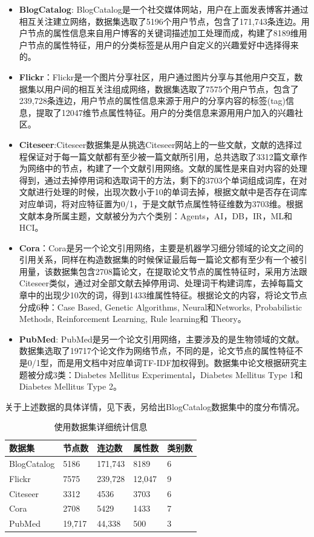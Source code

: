\begin{itemize}
	\item \textbf{BlogCatalog}: BlogCatalog是一个社交媒体网站，用户在上面发表博客并通过相互关注建立网络，数据集选取了5196个用户节点，包含了171,743条连边。用户节点的属性信息来自用户博客的关键词描述加工处理而成，构建了8189维用户节点的属性特征，用户的分类标签是从用户自定义的兴趣爱好中选择得来的。
	
	\item \textbf{Flickr}：Flickr是一个图片分享社区，用户通过图片分享与其他用户交互，数据集以用户间的相互关注组成网络，数据集选取了7575个用户节点，包含了239,728条连边，用户节点的属性信息来源于用户的分享内容的标签(tag)信息，提取了12047维节点属性特征。用户的分类信息来源用用户加入的兴趣社区。
	
	\item \textbf{Citeseer}:Citeseer数据集是从挑选Citeseer网站上的一些文献，文献的选择过程保证对于每一篇文献都有至少被一篇文献所引用，总共选取了3312篇文章作为网络中的节点，构建了一个文献引用网络。文献的属性是来自对内容的处理得到，通过去掉停用词和选取词干的方法，剩下的3703个单词组成词库，在对文献进行处理的时候，出现次数小于10的单词去掉，根据文献中是否存在词库对应单词，将对应特征置为0/1，于是文献节点属性特征维数为3703维。根据文献本身所属主题，文献被分为六个类别：Agents，AI，DB，IR，ML和HCI。
	
	\item \textbf{Cora}：Cora是另一个论文引用网络，主要是机器学习细分领域的论文之间的引用关系，同样在构造数据集的时候保证最后每一篇论文都有至少有一个被引用量，该数据集包含2708篇论文，在提取论文节点的属性特征时，采用方法跟Citeseer类似，通过对全部文献去掉停用词、处理词干构建词库，去掉每篇文章中的出现少10次的词，得到1433维属性特征。根据论文的内容，将论文节点分成6种：Case Based, Genetic Algorithms, Neural和Networks, Probabilistic Methods, Reinforcement Learning, Rule learning和 Theory。
	
	\item \textbf{PubMed}: PubMed是另一个论文引用网络，主要涉及的是生物领域的文献。数据集选取了19717个论文作为网络节点，不同的是，论文节点的属性特征不是0/1型，而是用文档中对应单词TF-IDF加权得到。数据集中论文根据研究主题被分成3类：Diabetes Mellitus Experimental，Diabetes Mellitus Type 1和Diabetes Mellitus Type 2。
	
\end{itemize}
关于上述数据的具体详情，见下表，另给出BlogCatalog数据集中的度分布情况。
\begin{table}
\centering
\caption{使用数据集详细统计信息}
\begin{tabular}{C{1in}C{1in}C{1in}C{1in}C{1in}}
\textbf{数据集} & \textbf{节点数} &\textbf{连边数} & \textbf{属性数}&\textbf{类别数}\\ \hline 
BlogCatalog & 5186  & 171,743 &8189&6\\
Flickr	& 7575 &239,728 & 12,047 & 9 \\
Citeseer& 3312 & 4536  &  3703 & 6 \\
Cora & 2708 &5429 & 1433 &7 \\
PubMed & 19,717 &44,338&500 &3 \\
\hline
\end{tabular}
\end{table}

